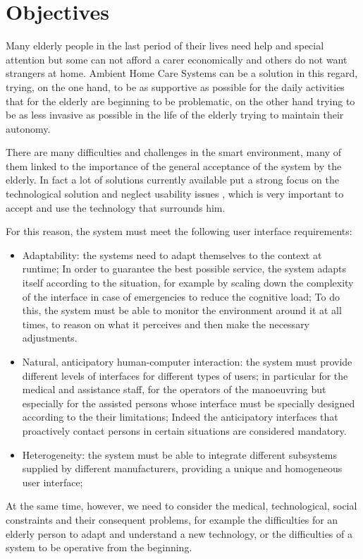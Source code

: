 \documentclass{thesisreport}
\begin{document}
 \section{Objectives}
 Many elderly people in the last period of their lives need help and special attention but some can not afford a carer economically and others do not want strangers at home. Ambient Home Care Systems can be a solution in this regard, trying, on the one hand, to be as supportive as possible for the daily activities that for the elderly are beginning to be problematic, on the other hand trying to be as less invasive as possible in the life of the elderly trying to maintain their autonomy.
 
 There are many difficulties and challenges in the smart environment, many of them linked to the importance of the general acceptance of the system by the elderly. In fact a lot of solutions currently available put a strong focus on the technological solution and neglect usability issues \cite{kleinberger2007ambient}, which is very important to accept and use the technology that surrounds him.
 
For this reason, the system must meet the following user interface requirements:
 \begin{itemize}
     \item Adaptability: the systems need to adapt themselves to the context at runtime;
     In order to guarantee the best possible service, the system adapts itself according to the situation, for example by scaling down the complexity of the interface in case of emergencies to reduce the cognitive load;
     To do this, the system must be able to monitor the environment around it at all times, to reason on what it perceives and then make the necessary adjustments.
     \item  Natural, anticipatory human-computer interaction: the system must provide different levels of interfaces for different types of users; in particular for the medical and assistance staff, for the operators of the manoeuvring but especially for the assisted persons whose interface must be specially designed according to the their limitations; 
     Indeed the anticipatory interfaces that proactively contact persons in certain situations are considered mandatory.
     \item Heterogeneity: the system must be able to integrate different subsystems supplied by different manufacturers, providing a unique and homogeneous user interface;
 \end{itemize}
 At the same time, however, we need to consider the medical, technological, social constraints and their consequent problems, for example the difficulties for an elderly person to adapt and understand a new technology, or the difficulties of a system to be operative from the beginning.
 
\end{document}
